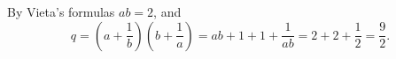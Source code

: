 By Vieta's formulas \(ab=2\), and
\[
q=\left(a+\dfrac{1}{b}\right)\left(b+\dfrac{1}{a}\right)=ab+1+1+\dfrac{1}{ab}=2+2+\dfrac{1}{2}=\boxed{\dfrac{9}{2}}.
\]
